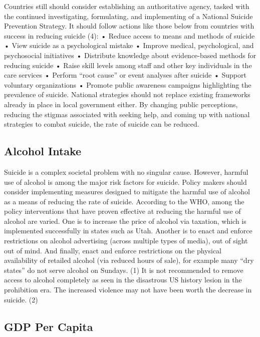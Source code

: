 \documentclass[]{article}
\begin{document}
Countries still should consider establishing an authoritative agency,
tasked with the continued investigating, formulating, and implementing
of a National Suicide Prevention Strategy. It should follow actions like
those below from countries with success in reducing suicide (4): •
Reduce access to means and methods of suicide • View suicide as a
psychological mistake • Improve medical, psychological, and psychosocial
initiatives • Distribute knowledge about evidence-based methods for
reducing suicide • Raise skill levels among staff and other key
individuals in the care services • Perform ``root cause'' or event
analyses after suicide • Support voluntary organizations • Promote
public awareness campaigns highlighting the prevalence of suicide.
National strategies should not replace existing frameworks already in
place in local government either. By changing public perceptions,
reducing the stigmas associated with seeking help, and coming up with
national strategies to combat suicide, the rate of suicide can be
reduced.

\subsection{Alcohol Intake}\label{alcohol-intake}

Suicide is a complex societal problem with no singular cause. However,
harmful use of alcohol is among the major risk factors for suicide.
Policy makers should consider implementing measures designed to mitigate
the harmful use of alcohol as a means of reducing the rate of suicide.
According to the WHO, among the policy interventions that have proven
effective at reducing the harmful use of alcohol are varied. One is to
increase the price of alcohol via taxation, which is implemented
successfully in states such as Utah. Another is to enact and enforce
restrictions on alcohol advertising (across multiple types of media),
out of sight out of mind. And finally, enact and enforce restrictions on
the physical availability of retailed alcohol (via reduced hours of
sale), for example many ``dry states'' do not serve alcohol on Sundays.
(1) It is not recommended to remove access to alcohol completely as seen
in the disastrous US history lesion in the prohibition era. The
increased violence may not have been worth the decrease in suicide. (2)

\subsection{GDP Per Capita}\label{gdp-per-capita}
\end{document}
